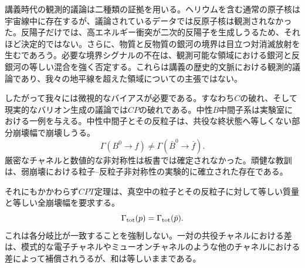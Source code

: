 講義時代の観測的議論は二種類の証拠を用いる。ヘリウムを含む通常の原子核は宇宙線中に存在するが、議論されているデータでは反原子核は観測されなかった。反陽子だけでは、高エネルギー衝突が二次的反陽子を生成しうるため、それほど決定的ではない。さらに、物質と反物質の銀河の境界は目立つ対消滅放射を生むであろう。必要な境界シグナルの不在は、観測可能な領域における銀河と反銀河の等しい混合を強く否定する。これらは講義の歴史的文脈における観測的議論であり、我々の地平線を超えた領域についての主張ではない。

\begin{classroomqa}
\end{classroomqa}

したがって我々には微視的なバイアスが必要である。すなわち\(C\)の破れ、そして現実的なバリオン生成の議論では\(CP\)の破れである。中性\(B\)中間子系は実験室における一例を与える。中性中間子とその反粒子は、共役な終状態へ等しくない部分崩壊幅で崩壊しうる。
\begin{equation}
\Gamma(B^0\to f)\ne\Gamma(\bar B^0\to\bar f).
\label{eq:c08-cp-partial}
\end{equation}
厳密なチャネルと数値的な非対称性は板書では確定されなかった。頑健な教訓は、弱崩壊における粒子--反粒子非対称性の実験的に確立された存在である。

それにもかかわらず\(CPT\)定理は、真空中の粒子とその反粒子に対して等しい質量と等しい全崩壊幅を要求する。
\begin{equation}
\Gamma_{\rm tot}(p)=\Gamma_{\rm tot}(\bar p).
\end{equation}
これは各分岐比が一致することを強制しない。一対の共役チャネルにおける差は、模式的な電子チャネルやミューオンチャネルのような他のチャネルにおける差によって補償されうるが、和は等しいままである。

\begin{classroomqa}
\end{classroomqa}


